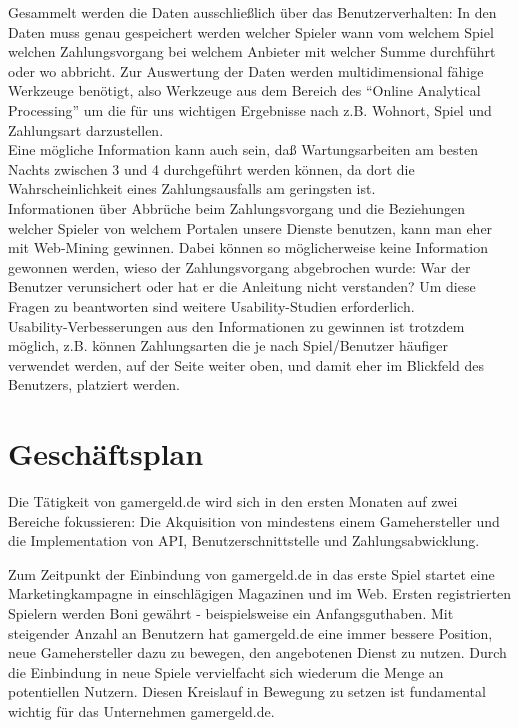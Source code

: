 \documentclass[a4paper,10pt]{article}
\begin{document}
Gesammelt werden die Daten ausschließlich über das Benutzerverhalten:
In den Daten muss genau gespeichert werden welcher Spieler wann vom welchem Spiel welchen Zahlungsvorgang bei welchem Anbieter mit welcher Summe durchführt oder wo abbricht.
Zur Auswertung der Daten werden multidimensional fähige Werkzeuge benötigt, also Werkzeuge aus dem Bereich des "`Online Analytical Processing"' um die für uns wichtigen Ergebnisse
nach z.B. Wohnort, Spiel und Zahlungsart darzustellen.\\
Eine mögliche Information kann auch sein, daß Wartungsarbeiten am besten Nachts zwischen 3 und 4 durchgeführt werden können, da dort die Wahrscheinlichkeit eines Zahlungsausfalls am geringsten ist.\\
Informationen über Abbrüche beim Zahlungsvorgang und die Beziehungen welcher Spieler von welchem Portalen unsere Dienste benutzen, kann man eher mit Web-Mining gewinnen.
Dabei können so möglicherweise keine Information gewonnen werden, wieso der Zahlungsvorgang abgebrochen wurde: War der Benutzer verunsichert oder hat er die Anleitung nicht verstanden?
Um diese Fragen zu beantworten sind weitere Usability-Studien erforderlich.\\
Usability-Verbesserungen aus den Informationen zu gewinnen ist trotzdem möglich, z.B. können Zahlungsarten die je nach Spiel/Benutzer häufiger verwendet werden, auf der Seite weiter oben, und damit eher im Blickfeld des Benutzers, platziert werden.

\section{Geschäftsplan}\label{labelGeschaeftsplan}
Die Tätigkeit von gamergeld.de wird sich in den ersten Monaten auf zwei Bereiche fokussieren: Die Akquisition von mindestens einem Gamehersteller und die Implementation von API, Benutzerschnittstelle und Zahlungsabwicklung.

Zum Zeitpunkt der Einbindung von gamergeld.de in das erste Spiel startet eine Marketingkampagne in einschlägigen Magazinen und im Web.
Ersten registrierten Spielern werden Boni gewährt - beispielsweise ein Anfangsguthaben.
Mit steigender Anzahl an Benutzern hat gamergeld.de eine immer bessere Position, neue Gamehersteller dazu zu bewegen, den angebotenen Dienst zu nutzen.
Durch die Einbindung in neue Spiele vervielfacht sich wiederum die Menge an potentiellen Nutzern.
Diesen Kreislauf in Bewegung zu setzen ist fundamental wichtig für das Unternehmen gamergeld.de.





\end{document}
